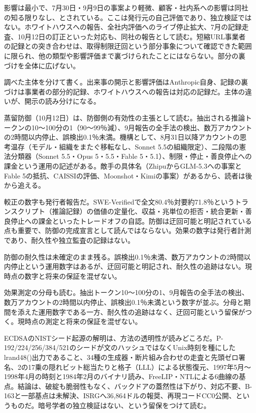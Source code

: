 \documentclass[lualatex,a4paper,10pt]{jlreq}
\begin{document}
影響は最小で、7月30日・9月9日の事案より軽微、顧客・社内系への影響は同社の知る限りなし、とされている。ここは発行元の自己評価であり、独立検証ではない。ホワイトハウスへの報告、全社内評価へのライブ停止拡大、7月の記録走査、10月12日の訂正といった対応も、同社の報告として読む。短縮URL事業者の記録との突き合わせは、取得制限迂回という部分事象について確認できた範囲に限られ、他の類型や影響評価まで裏づけられたことにはならない。部分の裏づけを全体に広げない。
\cite{B40,B79}


調べた主体を分けて書く。出来事の開示と影響評価はAnthropic自身、記録の裏づけは事業者の部分的記録、ホワイトハウスへの報告は対応の記録だ。主体の違いが、開示の読み分けになる。
\cite{B40,B79}


蒸留防御（10月12日）は、防御側の有効性の主張として読む。抽出される推論トークンの10〜100分の1（90〜99％減）、9月報告の全手法の検出、数万アカウントの2時間以内停止、誤検出0.1％未満。機構として、8月31日以降アカウントの思考温存（モデル・組織をまたぐ移転なし、Sonnet 5.5の組織限定）、二段階の憲法分類器（Sonnet 5.5・Opus 5・5.5・Fable 5・5.1）、制限・停止・善良停止への課金という運用の記述がある。敵手の具体名（ZhipuからGLM-5.3への事案とFable 5の抵抗、CAISSIの評価、Moonshot・Kimiの事案）があるから、読者は後から追える。
\cite{B41,B80}


較正の数字も発行者報告だ。SWE-Verifiedで全文80.4％対要約71.8％というトランスクリプト（推論記録）の価値の定量化、収益・兆単位の拒否・統合更新・善良停止への課金といったトレードオフの自認。防御は迂回可能と明記されている点も重要で、防御の完成宣言として読んではならない。効果の数字は発行者計測であり、耐久性や独立監査の記録はない。
\cite{B41,B80}


防御の耐久性は未確定のまま残る。誤検出0.1％未満、数万アカウントの2時間以内停止という運用数字はあるが、迂回可能と明記され、耐久性の追跡はない。現時点の数字と将来の保証を混ぜない。
\cite{B41,B80}


効果測定の分母も読む。抽出トークン10〜100分の1、9月報告の全手法の検出、数万アカウントの2時間以内停止、誤検出0.1％未満という数字が並ぶ。分母と期間を添えた運用数字である一方、耐久性の追跡はなく、迂回可能という留保がつく。現時点の測定と将来の保証を混ぜない。
\cite{B41,B80}


ECDSAのNISTシード起源の解明は、方法の透明性が読みどころだ。P-192/224/256/384/521のシードが文のハッシュではなくUnix時刻を種にしたlrand48()出力であること、34種の生成器・断片組み合わせの走査と先頭ゼロ署名、2の17乗の隠れビット総当たりと格子（LLL）による状態復元、1997年5月〜1998年4月の時刻と1984年2月のバイナリ読み、FreeLIP・NTLによる6曲線の基点。結論は、破綻も脆弱性もなく、バックドアの蓋然性は下がり、対応不要、B-163と一部基点は未解決、ISRGへ36,864ドルの報奨、再現コードCC0公開、というものだ。暗号学者の独立検証はない、という留保をつけて読む。
\cite{B42,B81}
\end{document}
